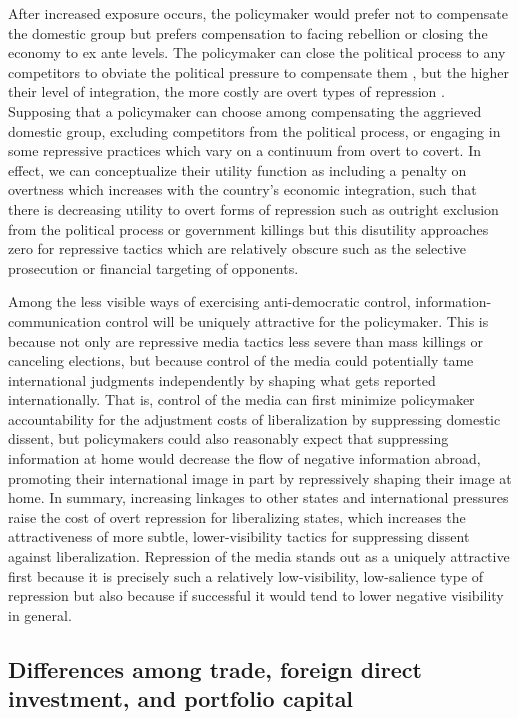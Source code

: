 \documentclass[12pt,a4paper]{article}\usepackage[]{graphicx}\usepackage[]{color}
\begin{document}
After increased exposure occurs, the policymaker would prefer not to compensate the domestic group but prefers compensation to facing rebellion or closing the economy to ex ante levels. The policymaker can close the political process to any competitors to obviate the political pressure to compensate them \parencite{Adsera:2002vt}, but the higher their level of integration, the more costly are overt types of repression \parencite{Levitsky:2002gx}. Supposing that a policymaker can choose among compensating the aggrieved domestic group, excluding competitors from the political process, or engaging in some repressive practices which vary on a continuum from overt to covert. In effect, we can conceptualize their utility function as including a penalty on overtness which increases with the country's economic integration, such that there is decreasing utility to overt forms of repression such as outright exclusion from the political process or government killings but this disutility approaches zero for repressive tactics which are relatively obscure such as the selective prosecution or financial targeting of opponents.

Among the less visible ways of exercising anti-democratic control, information-communication control will be uniquely attractive for the policymaker. This is because not only are repressive media tactics less severe than mass killings or canceling elections, but because control of the media could potentially tame international judgments independently by shaping what gets reported internationally. That is, control of the media can first minimize policymaker accountability for the adjustment costs of liberalization by suppressing domestic dissent, but policymakers could also reasonably expect that suppressing information at home would decrease the flow of negative information abroad, promoting their international image in part by repressively shaping their image at home. In summary, increasing linkages to other states and international pressures raise the cost of overt repression for liberalizing states, which increases the attractiveness of more subtle, lower-visibility tactics for suppressing dissent against liberalization. Repression of the media stands out as a uniquely attractive first because it is precisely such a relatively low-visibility, low-salience type of repression but also because if successful it would tend to lower negative visibility in general.

\subsection{Differences among trade, foreign direct investment, and portfolio capital}
\end{document}
